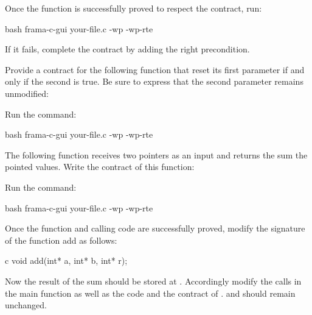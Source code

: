 Once the function is successfully proved to respect the contract, run:


\begin{CodeBlock}{bash}
frama-c-gui your-file.c -wp -wp-rte
\end{CodeBlock}


If it fails, complete the contract by adding the right precondition.






Provide a contract for the following function that reset its first parameter
if and only if the second is true. Be sure to express that the second parameter
remains unmodified:




Run the command:


\begin{CodeBlock}{bash}
frama-c-gui your-file.c -wp -wp-rte
\end{CodeBlock}





The following function receives two pointers as an input and returns the
sum the pointed values. Write the contract of this function:






Run the command:



\begin{CodeBlock}{bash}
frama-c-gui your-file.c -wp -wp-rte
\end{CodeBlock}



Once the function and calling code are successfully proved, modify the
signature of the function add as follows:



\begin{CodeBlock}{c}
void add(int* a, int* b, int* r);
\end{CodeBlock}


Now the result of the sum should be stored at . Accordingly
modify the calls in the main function as well as the code and the contract
of .  and  should remain
unchanged.



